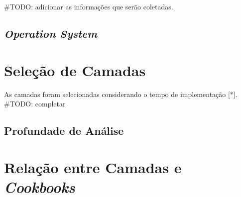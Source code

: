 #TODO: adicionar as informações que serão coletadas.

\subsection{\textit{Operation System}}
\label{sec:cam-os}

\section{Seleção de Camadas}
\label{sec:sel-cam}

As camadas foram selecionadas considerando o tempo de implementação [*].
#TODO: completar

\subsection{Profundade de Análise}

\section{Relação entre Camadas e \textit{Cookbooks}}
